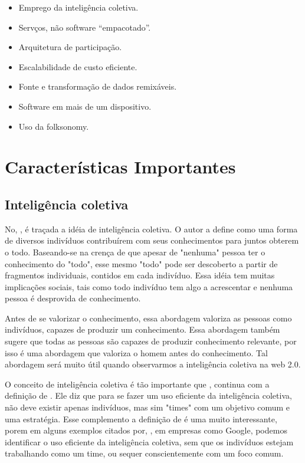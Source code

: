 \documentclass[
	12pt,				%
	openright,			%
	twoside,			%
	a4paper,			%
	Times,
	brazil,				%
	]{abntex2}
\begin{document}
\begin{itemize}
	\item{Emprego da inteligência coletiva.}
	\item{Servços, não software “empacotado”.}
	\item{Arquitetura de participação.}
	\item{Escalabilidade de custo eficiente.} 
	\item{Fonte e transformação de dados remixáveis.}
	\item{Software em mais de um dispositivo.}
	\item{Uso da folksonomy.}
\end{itemize}

\section{Características Importantes}

\subsection{Inteligência coletiva}

No, , é traçada a idéia de inteligência coletiva. O autor a define como uma forma de diversos indivíduos contribuírem com seus conhecimentos para juntos obterem o todo. Baseando-se na crença de que apesar de "nenhuma" pessoa ter o conhecimento do "todo", esse mesmo "todo" pode ser descoberto a partir de fragmentos individuais, contidos em cada indivíduo. Essa idéia tem muitas implicações sociais, tais como todo indivíduo tem algo a acrescentar e nenhuma pessoa é desprovida de conhecimento.
\par
Antes de se valorizar o conhecimento, essa abordagem valoriza as pessoas como indivíduos, capazes de produzir um conhecimento. Essa abordagem também sugere que todas as pessoas são capazes de produzir conhecimento relevante, por isso é uma abordagem que valoriza o homem antes do conhecimento. Tal abordagem será muito útil quando observarmos a inteligência coletiva na web 2.0. \cite{inteligencia-coletiva}
\par

O conceito de inteligência coletiva é tão importante que , continua com a definição de . Ele diz que para se fazer um uso eficiente da inteligência coletiva, não deve existir apenas indivíduos, mas sim "times" com um objetivo comum e uma estratégia. Esse complemento a definição de  é uma muito interessante, porem em alguns exemplos citados por, , em empresas como Google, podemos identificar o uso eficiente da inteligência coletiva, sem que os indivíduos estejam trabalhando como um time, ou sequer conscientemente com um foco comum.
\par
\end{document}
